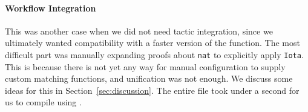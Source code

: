 \paragraph{Workflow Integration}
This was another case when we did not need tactic integration, since we
ultimately wanted compatibility with a faster version of the function.
The most difficult part was manually expanding proofs about \lstinline{nat}
to explicitly apply \lstinline{Iota}.
This is because there is not yet any way for manual configuration to supply custom matching functions,
and unification was not enough.
We discuss some ideas for this in Section~\ref{sec:discussion}. %
The entire file took under a second for us to compile using \toolname.







